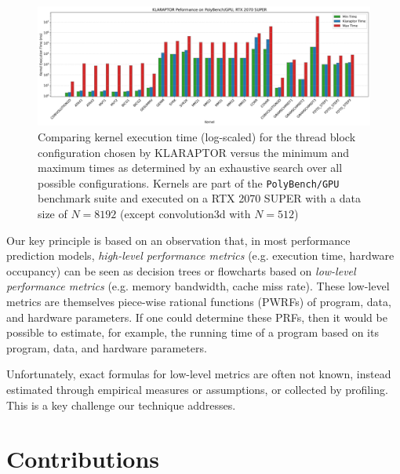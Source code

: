 \begin{figure}[t!]
	\includegraphics[width=1.00\textwidth, trim={0em, 0.9em, 0em, 0em}, clip]{Figures/MinMaxTimes-RTX-8192.png}
	\caption{Comparing kernel execution time (log-scaled) for the thread block configuration chosen by KLARAPTOR
		versus the minimum and maximum times as determined by an exhaustive search over all possible configurations. 
		Kernels are part of the \texttt{PolyBench/GPU} benchmark suite and executed on a RTX 2070 SUPER with a data 
		size of $N=8192$ (except convolution3d with $N=512$)}
	\label{fig:kernelperfintro}
\end{figure}


Our key principle is based on an observation 
that, in most performance prediction models,
\textit{high-level performance metrics} (e.g. execution time, hardware occupancy)
can be seen as decision trees or flowcharts
based on \textit{low-level performance metrics} (e.g. memory bandwidth, cache miss rate).
These low-level metrics are themselves
piece-wise rational functions (PWRFs) of
program, data, and hardware parameters.
If one could determine these PRFs, 
then it would be possible to estimate, for example, 
the running time of a program based on its
program, data, and hardware parameters. 


Unfortunately, exact formulas for low-level metrics are often not known, 
instead estimated through empirical measures or
assumptions, or collected by profiling.
This is a key challenge our technique addresses.

\section{Contributions}
\label{sec:contributions}

